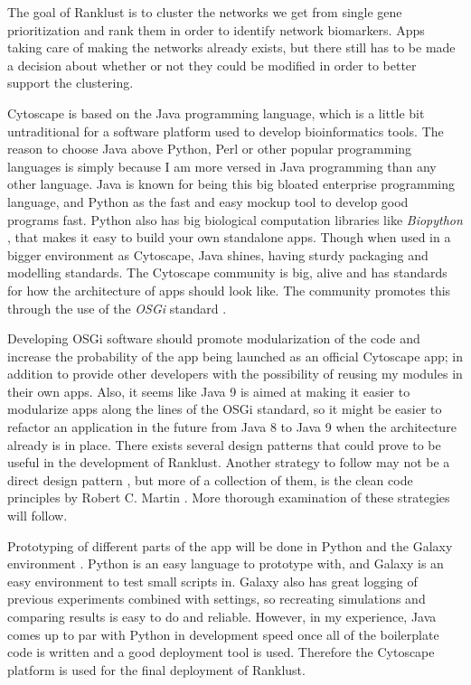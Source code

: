 \documentclass[UKenglish]{ifimaster}
\begin{document}
The goal of Ranklust is to cluster the networks we get from single gene prioritization and rank them in order to 
identify network biomarkers. Apps taking care of making the networks already exists, but there still has to be made a 
decision about whether or not they could be modified in order to better support the clustering.

Cytoscape is based on the Java programming language, which is a little bit untraditional for a software platform used to
develop bioinformatics tools. %
The reason to choose Java above Python, Perl or other popular programming languages is simply because I am more
versed in Java programming than any other language. Java is known for being this big bloated 
enterprise programming language, and Python as the fast and easy mockup tool to develop good programs fast. Python also
has big biological computation libraries like \emph{Biopython} \cite{biopython}, that makes it easy to build your own
standalone apps. Though when used in a bigger environment as Cytoscape, Java shines, having sturdy packaging and
modelling standards. The Cytoscape community is big, alive and has standards for how the architecture of apps should
look like. The community promotes this through the use of the \emph{OSGi} standard \cite{cytoscape-osgi}.

Developing OSGi software should promote modularization \cite{modularization} %
of the code and increase the probability of the app being launched as an official Cytoscape app; in addition to provide
other developers with the possibility of reusing my modules in their own apps. Also, it seems like Java 9 is aimed
at making it easier to modularize apps along the lines of the OSGi standard, so it might be easier to refactor an
application in the future from Java 8 to Java 9 when the architecture already is in place. There exists several design 
patterns that could prove to be useful in the development of Ranklust. Another strategy to follow may not be a direct 
design pattern \cite{designpattern}, but more of a collection of them, is the clean code principles by Robert C. Martin
\cite{cleancode}. More thorough examination of these strategies will follow.

Prototyping of different parts of the app will be done in Python and the Galaxy environment \cite{galaxy}. Python is an
easy language to prototype with, and Galaxy is an easy environment to test small scripts in. Galaxy also has great
logging of previous experiments combined with settings, so recreating simulations and comparing results is easy to do and
reliable. However, in my experience, Java comes up to par with Python in development speed once all of the boilerplate
code is written and a good deployment tool is used. Therefore the Cytoscape platform is used for the final deployment of
Ranklust.
\end{document}
